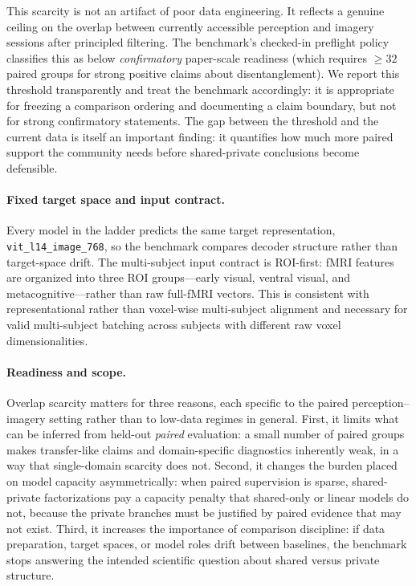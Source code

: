 \documentclass{article}
\begin{document}
This scarcity is not an artifact of poor data engineering.  It reflects a
genuine ceiling on the overlap between currently accessible perception and
imagery sessions after principled filtering.  The benchmark's checked-in
preflight policy classifies this as below \emph{confirmatory} paper-scale
readiness (which requires $\geq\!32$ paired groups for strong positive claims
about disentanglement).  We report this threshold transparently and treat the
benchmark accordingly: it is appropriate for freezing a comparison ordering and
documenting a claim boundary, but not for strong confirmatory statements.  The
gap between the threshold and the current data is itself an important finding:
it quantifies how much more paired support the community needs before
shared-private conclusions become defensible.

\paragraph{Fixed target space and input contract.}
Every model in the ladder predicts the same target representation,
\texttt{vit\_l14\_image\_768}, so the benchmark compares decoder structure
rather than target-space drift.  The multi-subject input contract is ROI-first:
fMRI features are organized into three ROI groups---early visual, ventral
visual, and metacognitive---rather than raw full-fMRI vectors.  This is
consistent with representational rather than voxel-wise multi-subject alignment
\citep{haxby2011hyperalignment} and necessary for valid multi-subject batching
across subjects with different raw voxel dimensionalities.

\paragraph{Readiness and scope.}
Overlap scarcity matters for three reasons, each specific to the paired
perception--imagery setting rather than to low-data regimes in general.  First,
it limits what can be inferred from held-out \emph{paired} evaluation: a small
number of paired groups makes transfer-like claims and domain-specific
diagnostics inherently weak, in a way that single-domain scarcity does not.
Second, it changes the burden placed on model capacity asymmetrically: when
paired supervision is sparse, shared-private factorizations pay a capacity
penalty that shared-only or linear models do not, because the private branches
must be justified by paired evidence that may not exist.  Third, it increases
the importance of comparison discipline: if data preparation, target spaces, or
model roles drift between baselines, the benchmark stops answering the intended
scientific question about shared versus private structure.
\end{document}
